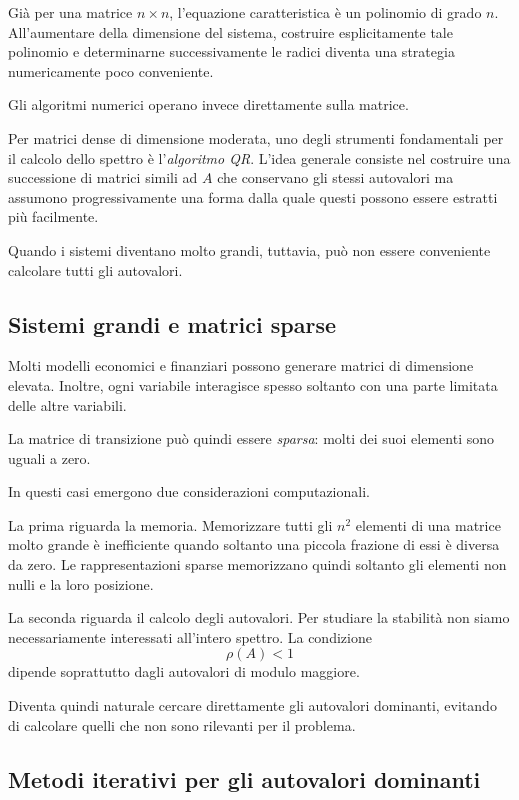 \documentclass{book}
\begin{document}
Già per una matrice $n\times n$, l'equazione caratteristica è un polinomio
di grado $n$. All'aumentare della dimensione del sistema, costruire
esplicitamente tale polinomio e determinarne successivamente le radici
diventa una strategia numericamente poco conveniente.

Gli algoritmi numerici operano invece direttamente sulla matrice.

Per matrici dense di dimensione moderata, uno degli strumenti fondamentali
per il calcolo dello spettro è l'\emph{algoritmo QR}. L'idea generale
consiste nel costruire una successione di matrici simili ad $A$ che
conservano gli stessi autovalori ma assumono progressivamente una forma
dalla quale questi possono essere estratti più facilmente.

Quando i sistemi diventano molto grandi, tuttavia, può non essere
conveniente calcolare tutti gli autovalori.


\subsection{Sistemi grandi e matrici sparse}

Molti modelli economici e finanziari possono generare matrici di dimensione
elevata. Inoltre, ogni variabile interagisce spesso soltanto con una parte
limitata delle altre variabili.

La matrice di transizione può quindi essere \emph{sparsa}: molti dei suoi
elementi sono uguali a zero.

In questi casi emergono due considerazioni computazionali.

La prima riguarda la memoria. Memorizzare tutti gli $n^2$ elementi di una
matrice molto grande è inefficiente quando soltanto una piccola frazione di
essi è diversa da zero. Le rappresentazioni sparse memorizzano quindi
soltanto gli elementi non nulli e la loro posizione.

La seconda riguarda il calcolo degli autovalori. Per studiare la stabilità
non siamo necessariamente interessati all'intero spettro. La condizione
\[
\rho(A)<1
\]
dipende soprattutto dagli autovalori di modulo maggiore.

Diventa quindi naturale cercare direttamente gli autovalori dominanti,
evitando di calcolare quelli che non sono rilevanti per il problema.


\subsection{Metodi iterativi per gli autovalori dominanti}
\end{document}
